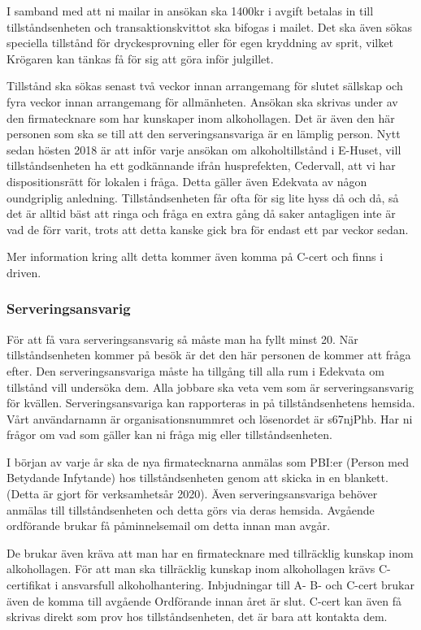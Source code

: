 \documentclass[10pt]{article}
\begin{document}
I samband med att ni mailar in ansökan ska 1400kr i avgift betalas in till tillståndsenheten och transaktionskvittot ska bifogas i mailet. Det ska även sökas speciella tillstånd för dryckesprovning eller för egen kryddning av sprit, vilket Krögaren kan tänkas få för sig att göra inför julgillet. 

Tillstånd ska sökas senast två veckor innan arrangemang för slutet sällskap och fyra veckor innan arrangemang för allmänheten. Ansökan ska skrivas under av den firmatecknare som har kunskaper inom alkohollagen. Det är även den här personen som ska se till att den serveringsansvariga är en lämplig person. 
Nytt sedan hösten 2018 är att inför varje ansökan om alkoholtillstånd i E-Huset, vill tillståndsenheten ha ett godkännande ifrån husprefekten, Cedervall, att vi har dispositionsrätt för lokalen i fråga. Detta gäller även Edekvata av någon oundgriplig anledning. Tillståndsenheten får ofta för sig lite hyss då och då, så det är alltid bäst att ringa och fråga en extra gång då saker antagligen inte är vad de förr varit, trots att detta kanske gick bra för endast ett par veckor sedan. 

Mer information kring allt detta kommer även komma på C-cert och finns i driven.

\subsubsection{Serveringsansvarig}
För att få vara serveringsansvarig så måste man ha fyllt minst 20. När tillståndsenheten kommer på besök är det den här personen de kommer att fråga efter. Den serveringsansvariga måste ha tillgång till alla rum i Edekvata om tillstånd vill undersöka dem. Alla jobbare ska veta vem som är serveringsansvarig för kvällen. Serveringsansvariga kan rapporteras in på tillståndsenhetens hemsida. 
Vårt användarnamn är organisationsnummret och lösenordet är s67njPhb. Har ni frågor om vad som gäller kan ni fråga mig eller tillståndsenheten.

I början av varje år ska de nya firmatecknarna anmälas som PBI:er (Person med Betydande Infytande) hos tillståndsenheten genom att skicka in en blankett. (Detta är gjort för verksamhetsår 2020). Även serveringsansvariga behöver anmälas till tillståndsenheten och detta görs via deras hemsida. Avgående ordförande brukar få påminnelsemail om detta innan man avgår.

De brukar även kräva att man har en firmatecknare med tillräcklig kunskap inom alkohollagen. För att man ska tillräcklig kunskap inom alkohollagen krävs C-certifikat i ansvarsfull alkoholhantering. 
Inbjudningar till A- B- och C-cert brukar även de komma till avgående Ordförande innan året är slut. C-cert kan även få skrivas direkt som prov hos tillståndsenheten, det är bara att kontakta dem.
\end{document}
